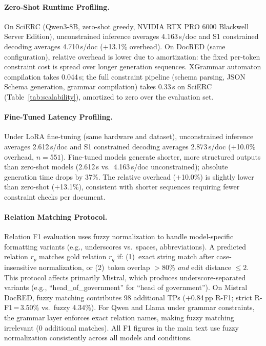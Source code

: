 
\paragraph{Zero-Shot Runtime Profiling.}
\label{app:runtime}

On SciERC (Qwen3-8B, zero-shot greedy, NVIDIA RTX PRO 6000 Blackwell Server Edition), unconstrained inference averages 4.163\,s/doc and S1 constrained decoding averages 4.710\,s/doc ($+$13.1\% overhead).
On DocRED (same configuration), relative overhead is lower due to amortization: the fixed per-token constraint cost is spread over longer generation sequences.
XGrammar automaton compilation takes 0.044\,s; the full constraint pipeline (schema parsing, JSON Schema generation, grammar compilation) takes 0.33\,s on SciERC (Table~\ref{tab:scalability}), amortized to zero over the evaluation set.

\paragraph{Fine-Tuned Latency Profiling.}
\label{app:ft-latency}
Under LoRA fine-tuning (same hardware and dataset), unconstrained inference averages 2.612\,s/doc and S1 constrained decoding averages 2.873\,s/doc ($+$10.0\% overhead, $n{=}551$).
Fine-tuned models generate shorter, more structured outputs than zero-shot models (2.612\,s vs.\ 4.163\,s/doc unconstrained); absolute generation time drops by 37\%.
The relative overhead ($+$10.0\%) is slightly lower than zero-shot ($+$13.1\%), consistent with shorter sequences requiring fewer constraint checks per document.


\paragraph{Relation Matching Protocol.}
\label{app:fuzzy-matching}
Relation F1 evaluation uses fuzzy normalization to handle model-specific formatting variants (e.g., underscores vs.\ spaces, abbreviations).
A predicted relation $r_p$ matches gold relation $r_g$ if: (1)~exact string match after case-insensitive normalization, or (2)~token overlap $>$80\% \emph{and} edit distance $\leq 2$.
This protocol affects primarily Mistral, which produces underscore-separated variants (e.g., ``head\_of\_government'' for ``head of government'').
On Mistral DocRED, fuzzy matching contributes 98 additional TPs ($+$0.84\,pp R-F1; strict R-F1\,=\,3.50\% vs.\ fuzzy 4.34\%).
For Qwen and Llama under grammar constraints, the grammar layer enforces exact relation names, making fuzzy matching irrelevant (0 additional matches).
All F1 figures in the main text use fuzzy normalization consistently across all models and conditions.


